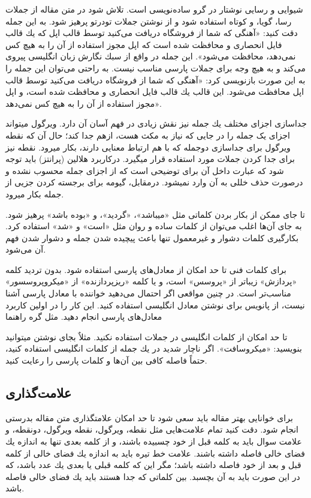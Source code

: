 \documentclass{CSICC2020}
\begin{document}
شیوایی و رسایی نوشتار در گرو ساده‌نویسی است. تلاش شود در متن مقاله از جملات رسا، گویا، و كوتاه استفاده شود و از نوشتن جملات تودرتو پرهیز شود. به این جمله دقت كنید: «آهنگی كه شما از فروشگاه  دریافت می‌كنید توسط قالب  اپل كه یك قالب فایل  انحصاری و محافظت شده است كه اپل مجوز استفاده از آن را به هیچ كس نمی‌دهد، محافظت می‌شود». این جمله در واقع از سبك نگارش زبان انگلیسی پیروی می‌كند و به هیچ وجه برای جملات پارسی مناسب نیست. به راحتی می‌توان این جمله را به این صورت بازنویسی كرد: «آهنگی كه شما از فروشگاه  دریافت می‌كنید توسط قالب  اپل محافظت می‌شود. این قالب یك قالب فایل  انحصاری و محافظت شده است، و اپل مجوز استفاده از آن را به هیچ كس نمی‌دهد».

جداسازی اجزای مختلف یك جمله نیز نقش زیادی در فهم آسان آن دارد. ویرگول می­تواند اجزای یک جمله را در جایی که نیاز به مکث هست، ازهم جدا کند؛ حال آن که نقطه ویرگول برای جداسازی دوجمله که با هم ارتباط معنایی دارند، بکار می­رود. نقطه نیز برای جدا كردن جملات مورد استفاده قرار می­گیرد. درکاربرد هلالین (پرانتز) باید توجه شود که عبارت داخل آن برای توضیحی است که از اجزای جمله محسوب نشده و درصورت حذف خللی به آن وارد نمی­شود. درمقابل، گیومه برای برجسته کردن جزیی از جمله بکار می­رود.

تا جای ممكن از بكار بردن كلماتی مثل «می­باشد»، «گردید»، و «بوده باشد» پرهیز شود. به جای آن‌ها اغلب می‌توان از كلمات ساده و روان مثل «است» و «شد» استفاده كرد. بكارگیری كلمات دشوار و غیرمعمول تنها باعث پیچیده شدن جمله و دشوار شدن فهم آن می‌شود.

برای كلمات فنی تا حد امكان از معادل‌های پارسی استفاده شود. بدون تردید كلمه «پردازش» زیباتر از «پروسس» است، و یا كلمه «ریزپردازنده» از «میكروپروسسور» مناسب‌تر است. در چنین مواقعی اگر احتمال می‌دهید خواننده با معادل پارسی آشنا نیست، از پانویس برای نوشتن معادل انگلیسی استفاده كنید. این كار را در اولین كاربرد معادل‌های پارسی انجام دهید. مثل گره راهنما

تا حد امكان از كلمات انگلیسی در جملات استفاده نكنید. مثلاٌ بجای نوشتن  می­توانید بنویسید: «میكروسافت». اگر ناچار شدید در یك جمله از كلمات انگلیسی استفاده كنید، حتماً فاصله كافی بین آن‌ها و كلمات پارسی را رعایت كنید.

\subsection{علامت‌گذاری}
برای خوانایی بهتر مقاله باید سعی شود تا حد امكان علامت­گذاری متن مقاله بدرستی انجام شود. دقت كنید تمام علامت‌هایی مثل نقطه، ویرگول، نقطه ویرگول، دونقطه، و علامت سوال باید به كلمه قبل از خود چسبیده باشند، و از كلمه بعدی تنها به اندازه یك فضای خالی فاصله داشته باشند. علامت خط تیره باید به اندازه یك فضای خالی از كلمه قبل و بعد از خود فاصله داشته باشد؛ مگر این كه كلمه قبلی یا بعدی یك عدد باشد، كه در این صورت باید به آن بچسبد. بین كلماتی كه جدا هستند باید یك فضای خالی فاصله باشد.
\end{document}
